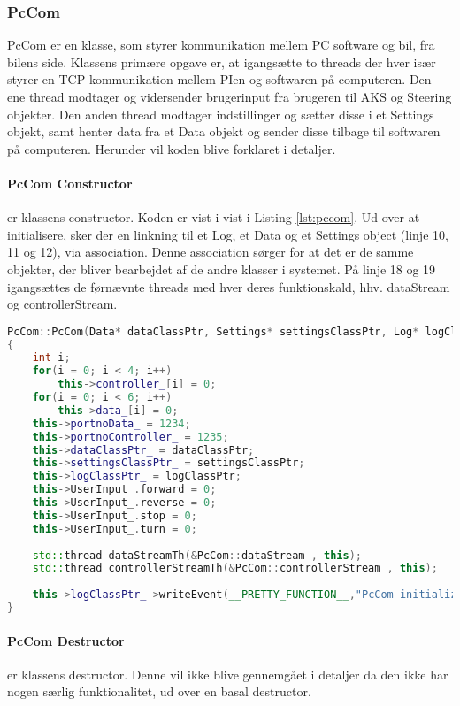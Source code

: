 \subsubsection{PcCom} \label{sec:pccom_impl}

PcCom er en klasse, som styrer kommunikation mellem PC software og bil, fra bilens side. Klassens primære opgave er, at igangsætte to threads der hver især styrer en TCP kommunikation mellem PIen og softwaren på computeren. Den ene thread modtager og vidersender brugerinput fra brugeren til AKS og Steering objekter. Den anden thread modtager indstillinger og sætter disse i et Settings objekt, samt henter data fra et Data objekt og sender disse tilbage til softwaren på computeren.
Herunder vil koden blive forklaret i detaljer.


\paragraph{PcCom Constructor} er klassens constructor. Koden er vist i vist i Listing \ref{lst:pccom}. Ud over at initialisere, sker der en linkning til et Log, et Data og et Settings object (linje 10, 11 og 12), via association. Denne association sørger for at det er de samme objekter, der bliver bearbejdet af de andre klasser i systemet. På linje 18 og 19 igangsættes de førnævnte threads med hver deres funktionskald, hhv. dataStream og controllerStream.

\begin{lstlisting}[caption={PcCom Constructor},label=lst:pccom, language=c++]
PcCom::PcCom(Data* dataClassPtr, Settings* settingsClassPtr, Log* logClassPtr)
{
    int i;
    for(i = 0; i < 4; i++)
        this->controller_[i] = 0;
    for(i = 0; i < 6; i++)
        this->data_[i] = 0;
    this->portnoData_ = 1234;
    this->portnoController_ = 1235;
    this->dataClassPtr_ = dataClassPtr;
    this->settingsClassPtr_ = settingsClassPtr;
    this->logClassPtr_ = logClassPtr;
    this->UserInput_.forward = 0;
    this->UserInput_.reverse = 0;
    this->UserInput_.stop = 0;
    this->UserInput_.turn = 0;
    
    std::thread dataStreamTh(&PcCom::dataStream , this);
    std::thread controllerStreamTh(&PcCom::controllerStream , this);
    
    this->logClassPtr_->writeEvent(__PRETTY_FUNCTION__,"PcCom initialized");
}
\end{lstlisting}


\paragraph{PcCom Destructor} er klassens destructor. Denne vil ikke blive gennemgået i detaljer da den ikke har nogen særlig funktionalitet, ud over en basal destructor.




